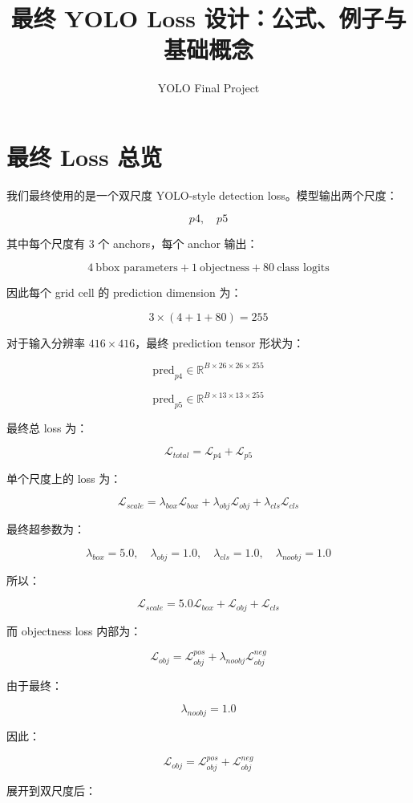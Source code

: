\documentclass[UTF8,12pt]{ctexart}
\title{最终 YOLO Loss 设计：公式、例子与基础概念}
\author{YOLO Final Project}
\date{}
\begin{document}
\maketitle

\section{最终 Loss 总览}

我们最终使用的是一个双尺度 YOLO-style detection loss。模型输出两个尺度：

\[
p4,\quad p5
\]

其中每个尺度有 3 个 anchors，每个 anchor 输出：

\[
4\ \text{bbox parameters} + 1\ \text{objectness} + 80\ \text{class logits}
\]

因此每个 grid cell 的 prediction dimension 为：

\[
3 \times (4 + 1 + 80) = 255
\]

对于输入分辨率 $416 \times 416$，最终 prediction tensor 形状为：

\[
\text{pred}_{p4} \in \mathbb{R}^{B \times 26 \times 26 \times 255}
\]

\[
\text{pred}_{p5} \in \mathbb{R}^{B \times 13 \times 13 \times 255}
\]

最终总 loss 为：

\[
\mathcal{L}_{total} = \mathcal{L}_{p4} + \mathcal{L}_{p5}
\]

单个尺度上的 loss 为：

\[
\mathcal{L}_{scale}
= \lambda_{box}\mathcal{L}_{box}
+ \lambda_{obj}\mathcal{L}_{obj}
+ \lambda_{cls}\mathcal{L}_{cls}
\]

最终超参数为：

\[
\lambda_{box}=5.0,\quad
\lambda_{obj}=1.0,\quad
\lambda_{cls}=1.0,\quad
\lambda_{noobj}=1.0
\]

所以：

\[
\mathcal{L}_{scale}
= 5.0\mathcal{L}_{box}
+ \mathcal{L}_{obj}
+ \mathcal{L}_{cls}
\]

而 objectness loss 内部为：

\[
\mathcal{L}_{obj}
= \mathcal{L}_{obj}^{pos}
+ \lambda_{noobj}\mathcal{L}_{obj}^{neg}
\]

由于最终：

\[
\lambda_{noobj}=1.0
\]

因此：

\[
\mathcal{L}_{obj}
= \mathcal{L}_{obj}^{pos}
+ \mathcal{L}_{obj}^{neg}
\]

展开到双尺度后：
\end{document}
